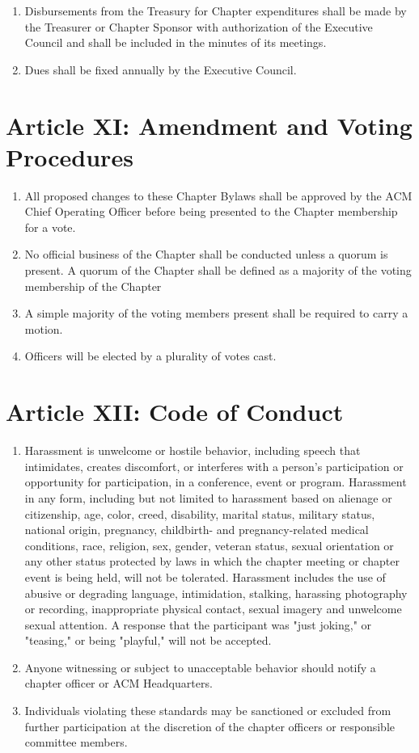 \begin{enumerate}
	\item Disbursements from the Treasury for Chapter expenditures shall be made by the Treasurer or Chapter Sponsor with authorization of the Executive Council and shall be included in the minutes of its meetings.
	\item Dues shall be fixed annually by the Executive Council.
\end{enumerate}

\section*{Article XI: Amendment and Voting Procedures}
\begin{enumerate}
	\item All proposed changes to these Chapter Bylaws shall be approved by the ACM Chief Operating Officer before being presented to the Chapter membership for a vote.
	\item No official business of the Chapter shall be conducted unless a quorum is present. A quorum of the Chapter shall be defined as a majority of the voting membership of the Chapter
	\item A simple majority of the voting members present shall be required to carry a motion.
	\item Officers will be elected by a plurality of votes cast.
\end{enumerate}

\section*{Article XII: Code of Conduct}

\begin{enumerate}
	\item Harassment is unwelcome or hostile behavior, including speech that intimidates, creates discomfort, or interferes with a person's participation or opportunity for participation, in a conference, event or program. Harassment in any form, including but not limited to harassment based on alienage or citizenship, age, color, creed, disability, marital status, military status, national origin, pregnancy, childbirth- and pregnancy-related medical conditions, race, religion, sex, gender, veteran status, sexual orientation or any other status protected by laws in which the chapter meeting or chapter event is being held, will not be tolerated. Harassment includes the use of abusive or degrading language, intimidation, stalking, harassing photography or recording, inappropriate physical contact, sexual imagery and unwelcome sexual attention. A response that the participant was "just joking," or "teasing," or being "playful," will not be accepted.
	\item Anyone witnessing or subject to unacceptable behavior should notify a chapter officer or ACM Headquarters.
	\item Individuals violating these standards may be sanctioned or excluded from further participation at the discretion of the chapter officers or responsible committee members.
\end{enumerate}

